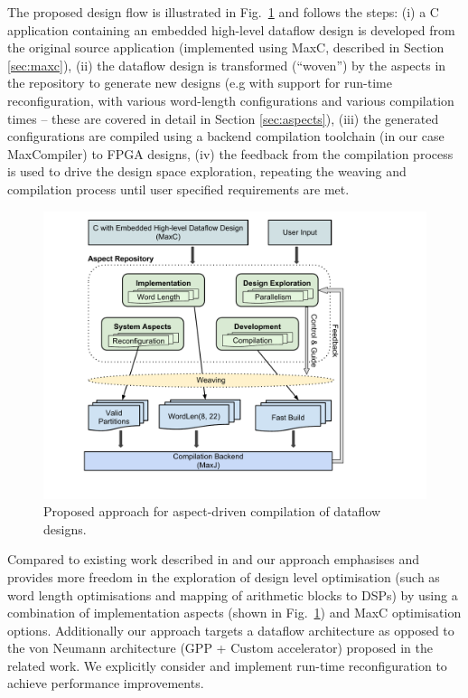 The proposed design flow is illustrated in Fig.~\ref{fig:design-flow}
and follows the steps: (i) a C application containing an embedded
high-level dataflow design is developed from the original source
application (implemented using MaxC, described in Section
\ref{sec:maxc}), (ii) the dataflow design is transformed (``woven'')
by the aspects in the repository to generate new designs (e.g with
support for run-time reconfiguration, with various word-length
configurations and various compilation times -- these are covered in
detail in Section \ref{sec:aspects}), (iii) the generated
configurations are compiled using a backend compilation toolchain (in
our case MaxCompiler) to FPGA designs, (iv) the feedback from the
compilation process is used to drive the design space exploration,
repeating the weaving and compilation process until user specified
requirements are met.

\begin{figure}[!h]
  \includegraphics[scale=0.48, trim=60 50 0 0]{figs/design-flow}
  \caption{Proposed approach for aspect-driven compilation of dataflow
    designs.}
  \label{fig:design-flow}
\end{figure}

Compared to existing work described in
\cite{Cardoso:Teixeira:Alves:Nobre:Diniz:Cutinho:Luk:2012} and
\cite{cardoso2011new} our approach emphasises and provides more
freedom in the exploration of design level optimisation (such as word
length optimisations and mapping of arithmetic blocks to DSPs) by
using a combination of implementation aspects (shown in
Fig.~\ref{fig:design-flow}) and MaxC optimisation options.
Additionally our approach targets a dataflow architecture as opposed
to the von Neumann architecture (GPP + Custom accelerator) proposed in
the related work. We explicitly consider and implement run-time
reconfiguration to achieve performance improvements.
